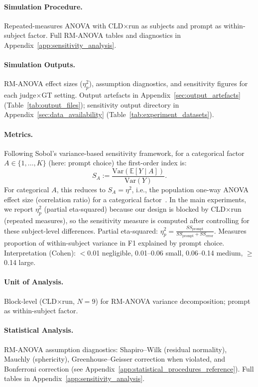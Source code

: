 \paragraph{Simulation Procedure.}
Repeated-measures ANOVA with CLD$\times$run as subjects and prompt as within-subject factor.
Full RM-ANOVA tables and diagnostics in Appendix~\ref{app:sensitivity_analysis}.

\paragraph{Simulation Outputs.}
RM-ANOVA effect sizes ($\eta^2_p$), assumption diagnostics, and sensitivity figures for each judge$\times$GT setting.
Output artefacts in Appendix~\ref{sec:output_artefacts} (Table~\ref{tab:output_files}); sensitivity output directory in Appendix~\ref{sec:data_availability} (Table~\ref{tab:experiment_datasets}).

\paragraph{Metrics.}
Following Sobol's variance-based sensitivity framework, for a categorical factor $A\in\{1,\dots,K\}$ (here: prompt choice) the first-order index is:
\begin{equation}
S_A := \frac{\mathrm{Var}(\mathbb{E}[Y \mid A])}{\mathrm{Var}(Y)}.
\end{equation}
For categorical $A$, this reduces to $S_A=\eta^2$,
i.e., the population one-way ANOVA effect size (correlation ratio) for a categorical factor~\cite{saltelli2010variance}. In the main
experiments, we report $\eta^2_p$ (partial eta-squared) because our design is blocked by CLD$\times$run (repeated
measures), so the sensitivity measure is computed after controlling for these subject-level differences.
Partial eta-squared: $\eta^2_p = \frac{SS_{\text{prompt}}}{SS_{\text{prompt}} + SS_{\text{error}}}$. Measures proportion of within-subject variance in F1 explained by prompt choice. Interpretation (Cohen): $<$0.01 negligible, 0.01--0.06 small, 0.06--0.14 medium, $\geq$0.14 large.

\paragraph{Unit of Analysis.}
Block-level (CLD$\times$run, $N=9$) for RM-ANOVA variance decomposition; prompt as within-subject factor.

\paragraph{Statistical Analysis.}
RM-ANOVA assumption diagnostics: Shapiro--Wilk (residual normality), Mauchly (sphericity), Greenhouse--Geisser correction when violated, and Bonferroni correction (see Appendix~\ref{app:statistical_procedures_reference}). Full tables in Appendix~\ref{app:sensitivity_analysis}.

